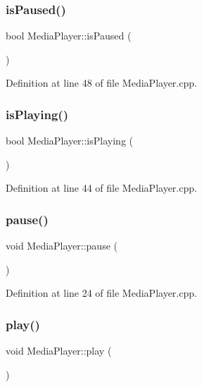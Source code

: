 \subsubsection{\texorpdfstring{is\+Paused()}{isPaused()}}
{\footnotesize\ttfamily bool Media\+Player\+::is\+Paused (\begin{DoxyParamCaption}{ }\end{DoxyParamCaption})}



Definition at line 48 of file Media\+Player.\+cpp.

\mbox{\label{class_media_player_a1a0c1276e6c3d5954dc80a00787e8568}} 
\subsubsection{\texorpdfstring{is\+Playing()}{isPlaying()}}
{\footnotesize\ttfamily bool Media\+Player\+::is\+Playing (\begin{DoxyParamCaption}{ }\end{DoxyParamCaption})}



Definition at line 44 of file Media\+Player.\+cpp.

\mbox{\label{class_media_player_a790f3b46f3961771fe67ce57591eb9d1}} 
\subsubsection{\texorpdfstring{pause()}{pause()}}
{\footnotesize\ttfamily void Media\+Player\+::pause (\begin{DoxyParamCaption}{ }\end{DoxyParamCaption})}



Definition at line 24 of file Media\+Player.\+cpp.

\mbox{\label{class_media_player_a64c608f3b47cafae19ec60c9435df099}} 
\subsubsection{\texorpdfstring{play()}{play()}}
{\footnotesize\ttfamily void Media\+Player\+::play (\begin{DoxyParamCaption}{ }\end{DoxyParamCaption})}



